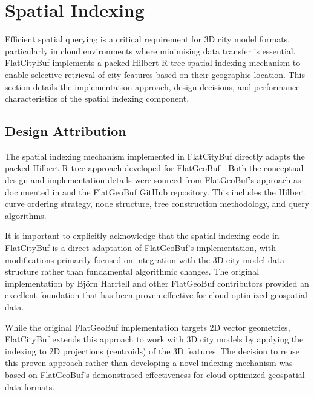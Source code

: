 
\section{Spatial Indexing}
\label{methodology:spatial_index}

Efficient spatial querying is a critical requirement for 3D city model formats, particularly in cloud environments where minimising data transfer is essential. FlatCityBuf implements a packed Hilbert R-tree spatial indexing mechanism \citep{Roussopoulos_Leifker_1985} to enable selective retrieval of city features based on their geographic location. This section details the implementation approach, design decisions, and performance characteristics of the spatial indexing component.

\subsection{Design Attribution}
\label{methodology:spatial_index:attribution}

The spatial indexing mechanism implemented in FlatCityBuf directly adapts the packed Hilbert R-tree approach developed for FlatGeoBuf \citep{horance_2022_detail}. Both the conceptual design and implementation details were sourced from FlatGeoBuf's approach as documented in \citet{horance_2022_overview} and the FlatGeoBuf GitHub repository. This includes the Hilbert curve ordering strategy, node structure, tree construction methodology, and query algorithms.

It is important to explicitly acknowledge that the spatial indexing code in FlatCityBuf is a direct adaptation of FlatGeoBuf's implementation, with modifications primarily focused on integration with the 3D city model data structure rather than fundamental algorithmic changes. The original implementation by Björn Harrtell and other FlatGeoBuf contributors \citep{flatgeobuf} provided an excellent foundation that has been proven effective for cloud-optimized geospatial data.

While the original FlatGeoBuf implementation targets 2D vector geometries, FlatCityBuf extends this approach to work with 3D city models by applying the indexing to 2D projections (centroids) of the 3D features. The decision to reuse this proven approach rather than developing a novel indexing mechanism was based on FlatGeoBuf's demonstrated effectiveness for cloud-optimized geospatial data formats.

